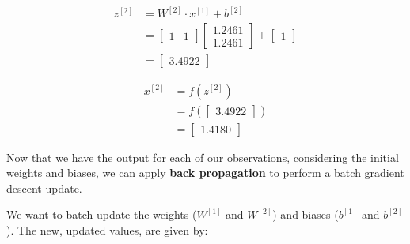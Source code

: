 \documentclass[12pt]{article}
\begin{document}
\begin{enumerate}[leftmargin=\labelsep]
\begin{paracol}{3}
              $$
                  \begin{aligned}
                      z^{[2]} & = W^{[2]} \cdot x^{[1]} + b^{[2]} \\
                              & = \begin{bmatrix}
                                      1 &
                                      1
                                  \end{bmatrix}
                      \begin{bmatrix}
                          1.2461 \\
                          1.2461
                      \end{bmatrix}
                      +
                      \begin{bmatrix}
                          1
                      \end{bmatrix}                              \\
                              & = \begin{bmatrix}{}
                                      3.4922
                                  \end{bmatrix}
                  \end{aligned}
              $$

              $$
                  \begin{aligned}
                      x^{[2]} & = f(z^{[2]})                  \\
                              & = f\left(\begin{bmatrix}{}
                                                 3.4922
                                             \end{bmatrix}\right) \\
                              & = \begin{bmatrix}{}
                                      1.4180
                                  \end{bmatrix}
                  \end{aligned}
              $$

          \end{paracol}

          Now that we have the output for each of our observations, considering
          the initial weights and biases, we can apply \textbf{back propagation} to
          perform a batch gradient descent update.

          We want to batch update the weights ($W^{[1]}$ and $W^{[2]}$) and biases
          ($b^{[1]}$ and $b^{[2]}$). The new, updated values, are given by:


\end{enumerate}
\end{document}
